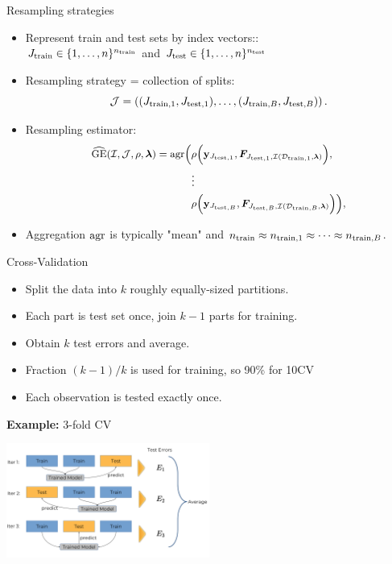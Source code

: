 \documentclass[11pt,compress,t,notes=noshow, xcolor=table]{beamer}
\begin{document}
\begin{vbframe}{Resampling strategies}
\footnotesize
\begin{itemize}
  \item Represent train and test sets by index
  vectors::\\ 
  $\Jtrain \in \nset^{\ntrain}$ and $\Jtest
  \in \nset^{\ntest}$
  \item Resampling strategy = collection of splits:
  $$\JJ = \JJset.$$
  \item Resampling estimator:  
\begin{equation*}
\small
\begin{split}
\GEhresa = \agr\Big(
 &\rho\Big(\yv_{\Jtesti[1]}, \FJtestftraini[1]\Big), \\ &\large{\vdots} \\
& \rho\Big(\yv_{\Jtesti[B]}, \FJtestftraini[B]\Big)
    \Big),
\end{split}
\end{equation*}
\item Aggregation $\agr$ is typically "mean" and $\ntrain \approx \ntraini[1] \approx \dots \approx \ntraini[B]$.
\end{itemize}

\end{vbframe}


\begin{vbframe}{Cross-Validation}

\begin{itemize}
  \item Split the data into $k$ roughly equally-sized partitions.
  \item Each part is test set once, join $k-1$ parts for training.
  \item Obtain $k$ test errors and average.
  \item Fraction $(k-1)/k$ is used for training, so 90\% for 10CV
  \item Each observation is tested exactly once.
\end{itemize}

\lz

\textbf{Example:} 3-fold CV

\begin{center}
\includegraphics[width=0.5\textwidth]{figure_man/crossvalidation.png}
\end{center}
\end{vbframe}
\end{document}
